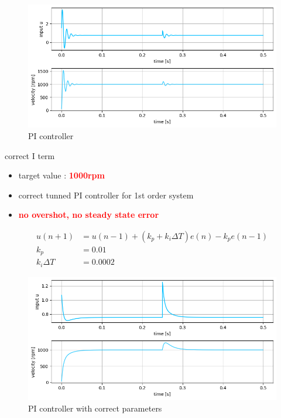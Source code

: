 \documentclass[12pt,twoside,onecolumn,openany,extrafontsizes,dvipsnames]{memoir}
\begin{document}
                    
                    \begin{figure}[!htb]
                        \centering
                        \includegraphics[scale=0.8]{../images/motor_control/pid_pi_control_0.png}
                        \caption{PI controller}
                        \label{fig:pi_controller}
                    \end{figure}

                    correct I term

                    \begin{itemize}
                        \item  target value : \textcolor{red}{\textbf {1000rpm}}
                        \item  correct tunned PI controller for 1st order system
                        \item  \textcolor{red}{\textbf {no overshot, no steady state error}}
                    \end{itemize}
                    
                    \begin{align}
                        u(n+1) &= u(n-1) + (k_p + k_i\Delta T) e(n) - k_pe(n-1) \\
                        k_p    &= 0.01 \nonumber \\
                        k_i\Delta T    &= 0.0002 \nonumber
                    \end{align}

                    \begin{figure}[!htb]
                        \centering
                        \includegraphics[scale=0.8]{../images/motor_control/pid_pi_control_1.png}
                        \caption{PI controller with correct parameters}
                        \label{fig:pi_controller_correct}
                    \end{figure}
                    
\end{document}
